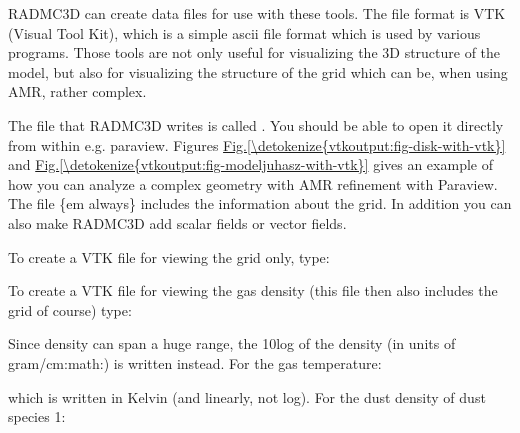 \documentclass[letterpaper,10pt,english]{sphinxmanual}
\begin{document}
RADMC\sphinxhyphen{}3D can create data files for use with these tools. The file format is
VTK (Visual Tool Kit), which is a simple ascii file format which is used by
various programs. Those tools are not only useful for visualizing the
3\sphinxhyphen{}D structure of the model, but also for visualizing the structure of the
grid which can be, when using AMR, rather complex.

The file that RADMC\sphinxhyphen{}3D writes is called . You should be able to
open it directly from within e.g. paraview. Figures \hyperref[\detokenize{vtkoutput:fig-disk-with-vtk}]{Fig.\@ \ref{\detokenize{vtkoutput:fig-disk-with-vtk}}}
and \hyperref[\detokenize{vtkoutput:fig-modeljuhasz-with-vtk}]{Fig.\@ \ref{\detokenize{vtkoutput:fig-modeljuhasz-with-vtk}}} gives an example of how you can analyze a
complex geometry with AMR refinement with Paraview. The file \{em always\}
includes the information about the grid. In addition you can also make RADMC\sphinxhyphen{}3D
add scalar fields or vector fields.

To create a VTK file for viewing the grid only, type:

\begin{sphinxVerbatim}[commandchars=\\\{\}]
 
\end{sphinxVerbatim}

To create a VTK file for viewing the gas density (this file then also
includes the grid of course) type:

\begin{sphinxVerbatim}[commandchars=\\\{\}]
 
\end{sphinxVerbatim}

Since density can span a huge range, the 10\sphinxhyphen{}log of the density (in units of
gram/cm:math:) is written instead. For the gas temperature:

\begin{sphinxVerbatim}[commandchars=\\\{\}]
 
\end{sphinxVerbatim}

which is written in Kelvin (and linearly, not log). For the dust density of
dust species 1:

\begin{sphinxVerbatim}[commandchars=\\\{\}]
  
\end{sphinxVerbatim}
\end{document}
